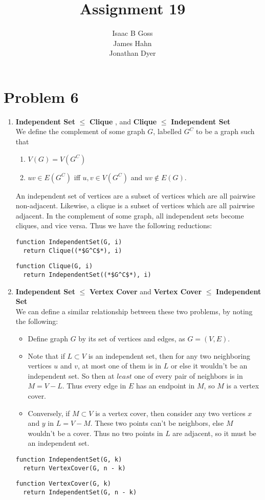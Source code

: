 \documentclass{article}
\author{Isaac B Goss\\ James Hahn\\ Jonathan Dyer}
\title{Assignment 19}
\providecommand{\prob}[1]{\section*{Problem #1}}
\providecommand{\reducible}[2]{
  \textbf{#1} $\leq$ \textbf{#2}
}
\begin{document}
\maketitle

\prob{6}

\begin{enumerate}
  \item \reducible{Independent Set}{Clique}, and \reducible{Clique}{Independent Set} \\
  We define the complement of some graph $G$, labelled $G^C$ to be a graph such that
  \begin{enumerate}
    \item $V(G) = V(G^C)$
    \item $uv \in E(G^C)$ iff $u,v \in V(G^C)$ and $uv \not\in E(G)$.
  \end{enumerate}
  An independent set of vertices are a subset of vertices which are all pairwise non-adjacent.
  Likewise, a clique is a subset of vertices which are all pairwise adjacent.
  In the complement of some graph, all independent sets become cliques, and vice versa.
  Thus we have the following reductions:
  \begin{lstlisting}
function IndependentSet(G, i)
  return Clique((*$G^C$*), i)
  \end{lstlisting}
  \begin{lstlisting}
function Clique(G, i)
  return IndependentSet((*$G^C$*), i)
  \end{lstlisting}
  \item \reducible{Independent Set}{Vertex Cover} and \reducible{Vertex Cover}{Independent Set} \\
  We can define a similar relationship between these two problems, by noting the following:
  \begin{itemize}
    \item Define graph $G$ by its set of vertices and edges, as $G = (V,E)$.
    \item Note that if $L \subset V$ is an independent set, then for any two neighboring vertices $u$ and $v$, at most one of them is in $L$ or else it wouldn't be an independent set. So then at $least$ one of every pair of neighbors is in $M = V - L$. Thus every edge in $E$ has an endpoint in $M$, so $M$ is a vertex cover.
    \item Conversely, if $M \subset V$ is a vertex cover, then consider any two vertices $x$ and $y$ in $L = V - M$. These two points can't be neighbors, else $M$ wouldn't be a cover. Thus no two points in $L$ are adjacent, so it must be an independent set.
  \end{itemize}
  \begin{lstlisting}
function IndependentSet(G, k)
  return VertexCover(G, n - k)
  \end{lstlisting}
  \begin{lstlisting}
function VertexCover(G, k)
  return IndependentSet(G, n - k)
  \end{lstlisting}
\end{enumerate}
\end{document}
